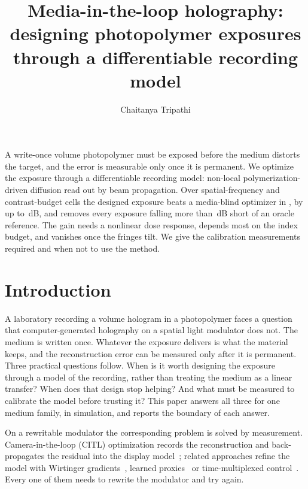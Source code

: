\documentclass{optica-article}
\begin{document}
\title{Media-in-the-loop holography: designing photopolymer exposures through a
differentiable recording model}

\author{Chaitanya Tripathi}

\address{Ashoka University, Rajiv Gandhi Education City, Sonipat, Haryana 131029, India. \href{https://orcid.org/0009-0002-4094-0323}{ORCID 0009-0002-4094-0323}}


\begin{abstract*}
A write-once volume photopolymer must be exposed before the medium distorts the
target, and the error is measurable only once it is permanent. We optimize the
exposure through a differentiable recording model: non-local
polymerization-driven diffusion read out by beam propagation. Over
\MOneNCells{} spatial-frequency and contrast-budget cells the designed exposure
beats a media-blind optimizer in \MOneNPositive{}, by up to
\MaxGainEightX\,dB, and removes every exposure falling more than
\WastedMediaThreshDB\,dB short of an oracle reference. The gain needs a
nonlinear dose response, depends most on the index budget, and vanishes once
the fringes tilt. We give the calibration measurements required and when not to
use the method.
\end{abstract*}

\section{Introduction}
A laboratory recording a volume hologram in a photopolymer faces a question
that computer-generated holography on a spatial light modulator does not. The
medium is written once. Whatever the exposure delivers is what the material
keeps, and the reconstruction error can be measured only after it is permanent.
Three practical questions follow. When is it worth designing the exposure
through a model of the recording, rather than treating the medium as a linear
transfer? When does that design stop helping? And what must be measured to
calibrate the model before trusting it? This paper answers all three for one
medium family, in simulation, and reports the boundary of each answer.

On a rewritable modulator the corresponding problem is solved by measurement.
Camera-in-the-loop (CITL) optimization records the reconstruction and
back-propagates the residual into the display
model~\cite{peng2020neural}; related approaches refine the model with
Wirtinger gradients~\cite{chakravarthula2019wirtinger}, learned
proxies~\cite{shi2021towards} or time-multiplexed
control~\cite{choi2022time}. Every one of them needs to rewrite the modulator
and try again.
\end{document}
